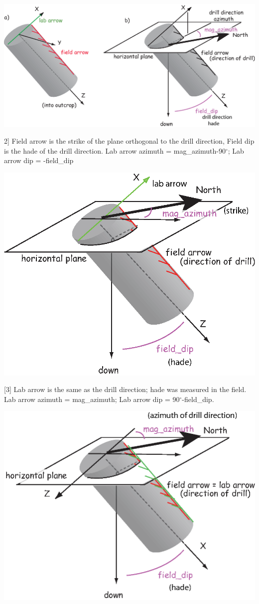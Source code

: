 \documentclass[11pt]{book}
\begin{document}
{{  \includegraphics[width=15cm]{EPSfiles/orcon_1.eps}
  
  2] Field arrow is the strike of the plane orthogonal to the drill direction, Field dip is the hade of the drill direction. Lab arrow azimuth = mag\_azimuth-90$^{\circ}$; Lab arrow dip = -field\_dip
  
    \includegraphics[width=15cm]{EPSfiles/orcon_2.eps}

  [3] Lab arrow is the same as the drill direction; hade was measured in the field. Lab arrow azimuth = mag\_azimuth; Lab arrow dip = 90$^{\circ}$-field\_dip.
  
      \includegraphics[width=15cm]{EPSfiles/orcon_3.eps}
  
}}
\end{document}
